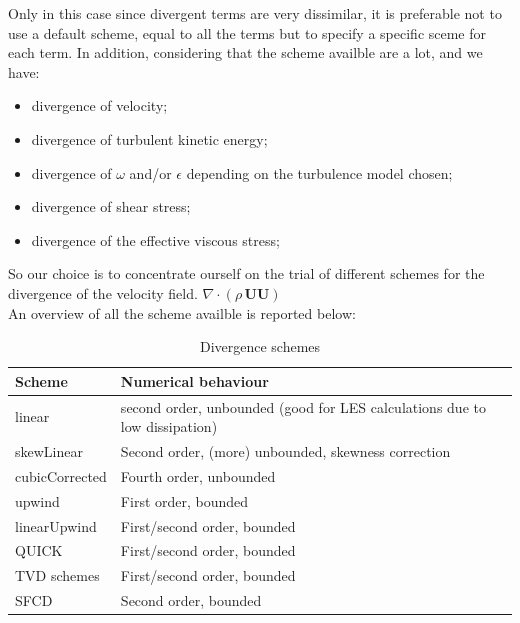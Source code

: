 \documentclass[a4paper,12pt]{article}
\begin{document}
Only in this case since divergent terms are very dissimilar, it is preferable not to use a default scheme, equal to all the terms but to specify a specific sceme for each term. In addition, considering that the scheme availble are a lot, and we have:
\begin{itemize} 
 \item divergence of velocity;
 \item divergence of turbulent kinetic energy;
 \item divergence of $\omega$ and/or $\epsilon$ depending on the turbulence model chosen;
 \item divergence of shear stress;
  \item divergence of the effective viscous stress; %
\end{itemize} 
So our choice is to concentrate ourself on the trial of different schemes for the divergence of the velocity field.
 $ \nabla \cdot ( \rho \, \bm{U} \bm{U} )$
\\ An overview of all the scheme availble is reported below:


\begin{table}[H]
\centering
\begin{tabular}{ll}
\toprule
Scheme         & Numerical behaviour                                                               \\ \midrule
linear         & second order, unbounded (good for LES calculations due to low dissipation) \\
skewLinear     & Second order, (more) unbounded, skewness correction                               \\
cubicCorrected & Fourth order, unbounded                                                           \\
upwind         & First order, bounded                                                              \\
linearUpwind   & First/second order, bounded                                                       \\
QUICK          & First/second order, bounded                                                       \\
TVD schemes    & First/second order, bounded                                                       \\
SFCD           & Second order, bounded                                                             \\ \bottomrule
\end{tabular}
\caption{Divergence schemes}
\label{table:divergence}
\end{table}
\end{document}
